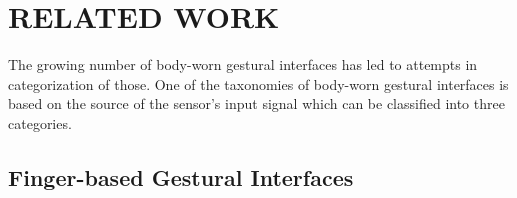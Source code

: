 \documentclass{sigchi}
\begin{document}
\section{RELATED WORK}

The growing number of body-worn gestural interfaces has led to attempts in categorization of those.
One of the taxonomies of body-worn gestural interfaces is based on the source of the sensor's input signal which can be classified into three categories.

\subsection{Finger-based Gestural Interfaces}



\end{document}
